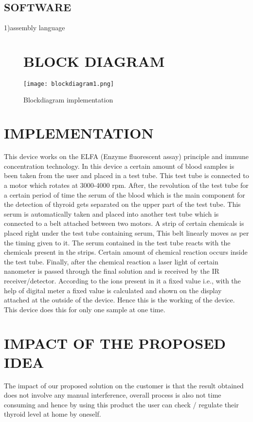 \documentclass[a4paper,12pt]{article}
\begin{document}
    \subsection{SOFTWARE}
    1)assembly language
    
    \begin{figure}
    	\section{BLOCK DIAGRAM}
    	\texttt{[image: blockdiagram1.png]}
    	\caption{Blockdiagram implementation}
    \end{figure}
    
    \newpage
    \section{IMPLEMENTATION}
    
    This device works on the ELFA (Enzyme fluorescent assay) principle and immune concentration technology.
    In this device a certain amount of blood samples is been taken from the user and placed in a test tube. 
    This test tube is connected to a motor which rotates at 3000-4000 rpm. After, the revolution of the test tube for a certain period of time the serum of the blood which is the main component for the detection of thyroid gets separated on the upper part of the test tube. 
    This serum is automatically taken and placed into another test tube which is connected to a belt attached between two motors.
    A strip of certain chemicals is placed right under the test tube containing serum, This belt linearly moves as per the timing given to it.
    The serum contained in the test tube reacts with the chemicals present in the strips. Certain amount of chemical reaction occurs inside the test tube. Finally, after the chemical reaction a laser light of certain nanometer is passed through the final solution and is received by the IR receiver/detector.
    According to the ions present in it a fixed value i.e., with the help of digital meter a fixed value is calculated and shown on the display attached at the outside of the device. Hence this is the working of the device. This device does this for only one sample at one time.
    
    \newpage
    \section{IMPACT OF THE PROPOSED IDEA}
    The impact of our proposed solution on the customer is that the result obtained does not involve any manual interference, overall process is also not time consuming and hence by using this product the user can check / regulate their thyroid level at home by oneself. 
    
    
\end{document}

